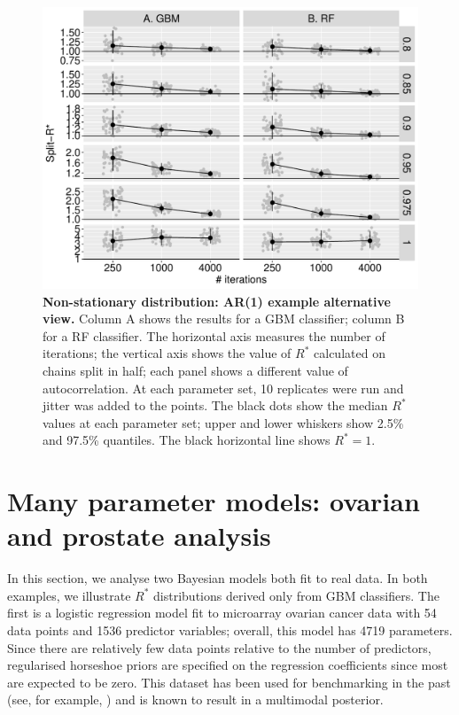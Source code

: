 \documentclass[ba]{imsart}
\numberwithin{equation}{section}
\theoremstyle{plain}
\begin{document}
\begin{supplement}
		\begin{figure}[!htb]
			\centerline{\includegraphics[width=1.0\textwidth]{trends_ar1_transposed.pdf}}
			\caption{\textbf{Non-stationary distribution: AR(1) example alternative view.} Column A shows the results for a GBM classifier; column B for a RF classifier. The horizontal axis measures the number of iterations; the vertical axis shows the value of $R^*$ calculated on chains split in half; each panel shows a different value of autocorrelation. At each parameter set, 10 replicates were run and jitter was added to the points. The black dots show the median $R^*$ values at each parameter set; upper and lower whiskers show 2.5\% and 97.5\% quantiles. The black horizontal line shows $R^*=1$. }
			\label{fig:trends_ar1_transposed}
		\end{figure}
		
		\section{Many parameter models: ovarian and prostate analysis}\label{sec:prostate}
		In this section, we analyse two Bayesian models both fit to real data. In both examples, we illustrate $R^*$ distributions derived only from GBM classifiers. The first is a logistic regression model fit to microarray ovarian cancer data with 54 data points and 1536 predictor variables; overall, this model has 4719 parameters. Since there are relatively few data points relative to the number of predictors, regularised horseshoe priors are specified on the regression coefficients \citep{piironen2017sparsity} since most are expected to be zero. This dataset has been used for benchmarking in the past (see, for example, \cite{schummer1999comparative,hernandez2010expectation,paananen2019implicitly}) and is known to result in a multimodal posterior.
		

\end{supplement}
\end{document}
